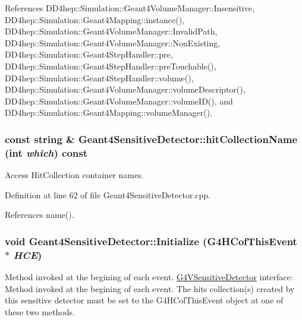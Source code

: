 References DD4hep::Simulation::Geant4VolumeManager::Insensitive, DD4hep::Simulation::Geant4Mapping::instance(), DD4hep::Simulation::Geant4VolumeManager::InvalidPath, DD4hep::Simulation::Geant4VolumeManager::NonExisting, DD4hep::Simulation::Geant4StepHandler::pre, DD4hep::Simulation::Geant4StepHandler::preTouchable(), DD4hep::Simulation::Geant4StepHandler::volume(), DD4hep::Simulation::Geant4VolumeManager::volumeDescriptor(), DD4hep::Simulation::Geant4VolumeManager::volumeID(), and DD4hep::Simulation::Geant4Mapping::volumeManager().\hypertarget{class_d_d4hep_1_1_simulation_1_1_geant4_sensitive_detector_ad8477ffc5ca65a24cb8270784177762d}{
\subsubsection[{hitCollectionName}]{\setlength{\rightskip}{0pt plus 5cm}const {\bf string} \& Geant4SensitiveDetector::hitCollectionName (int {\em which}) const}}
\label{class_d_d4hep_1_1_simulation_1_1_geant4_sensitive_detector_ad8477ffc5ca65a24cb8270784177762d}


Access HitCollection container names. 

Definition at line 62 of file Geant4SensitiveDetector.cpp.

References name().\hypertarget{class_d_d4hep_1_1_simulation_1_1_geant4_sensitive_detector_a7ee158e29937473f04db1cc6c7284923}{
\subsubsection[{Initialize}]{\setlength{\rightskip}{0pt plus 5cm}void Geant4SensitiveDetector::Initialize (G4HCofThisEvent $\ast$ {\em HCE})}}
\label{class_d_d4hep_1_1_simulation_1_1_geant4_sensitive_detector_a7ee158e29937473f04db1cc6c7284923}


Method invoked at the begining of each event. \hyperlink{class_g4_v_sensitive_detector}{G4VSensitiveDetector} interface: Method invoked at the begining of each event. The hits collection(s) created by this sensitive detector must be set to the G4HCofThisEvent object at one of these two methods. 

